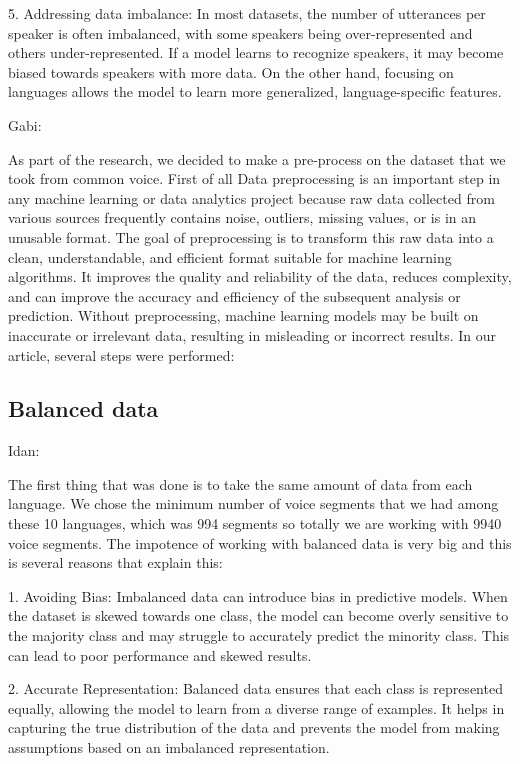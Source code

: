 \documentclass[a4paper]{article}
\begin{document}
5. Addressing data imbalance: In most datasets, the number of utterances per speaker is often imbalanced, with some speakers being over-represented and others under-represented. If a model learns to recognize speakers, it may become biased towards speakers with more data. On the other hand, focusing on languages allows the model to learn more generalized, language-specific features.

Gabi:

As part of the research, we decided to make a pre-process on the dataset that we took from common voice. First of all Data preprocessing is an important step in any machine learning or data analytics project because raw data collected from various sources frequently contains noise, outliers, missing values, or is in an unusable format. The goal of preprocessing is to transform this raw data into a clean, understandable, and efficient format suitable for machine learning algorithms. It improves the quality and reliability of the data, reduces complexity, and can improve the accuracy and efficiency of the subsequent analysis or prediction. Without preprocessing, machine learning models may be built on inaccurate or irrelevant data, resulting in misleading or incorrect results. In our article, several steps were performed:

\subsection{Balanced data}

Idan:

The first thing that was done is to take the same amount of data from each language. We chose the minimum number of voice segments that we had among these 10 languages, which was 994 segments so totally we are working with 9940 voice segments. The impotence of working with balanced data is very big and this is several reasons that explain this:\newline

1. Avoiding Bias: Imbalanced data can introduce bias in predictive models. When the dataset is skewed towards one class, the model can become overly sensitive to the majority class and may struggle to accurately predict the minority class. This can lead to poor performance and skewed results.\newline

2. Accurate Representation: Balanced data ensures that each class is represented equally, allowing the model to learn from a diverse range of examples. It helps in capturing the true distribution of the data and prevents the model from making assumptions based on an imbalanced representation.\newline
\end{document}
